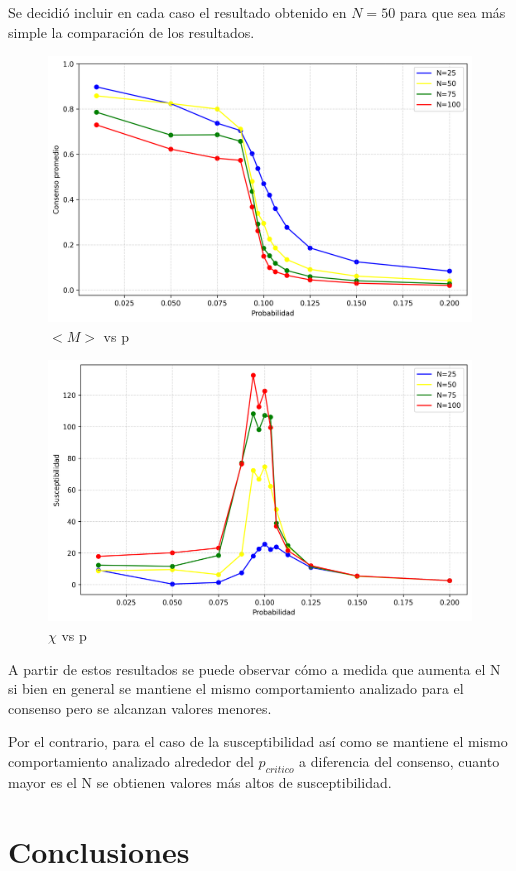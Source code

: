\documentclass[12pt]{article}
\begin{document}
Se decidió incluir en cada caso el resultado obtenido en $N = 50$ para que sea más simple la comparación de los resultados.

\begin{figure}[H]
    \centering
    \includegraphics[width=1\textwidth]{magnetization_mean_comparison.png} 
    \caption{$\lt M\gt $ vs p}
\end{figure}

\begin{figure}[H]
    \centering
    \includegraphics[width=1\textwidth]{susceptibilities_comparison.png} 
    \caption{$\chi$ vs p}
\end{figure}

A partir de estos resultados se puede observar cómo a medida que aumenta el N si bien en general se mantiene el mismo comportamiento analizado para el consenso pero se alcanzan valores menores. 

Por el contrario, para el caso de la susceptibilidad así como se mantiene el mismo comportamiento analizado alrededor del $p_{critico}$ a diferencia del consenso, cuanto mayor es el N se obtienen valores más altos de susceptibilidad.

\section{Conclusiones}
\end{document}
